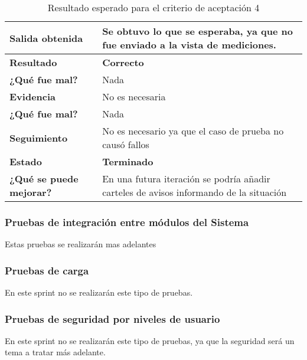 {\scriptsize
	\begin{table}[h]

	\centering
	\begin{tabular}{|m{3cm}|m{10cm}|}
	    \hline 
	    \textbf{Salida obtenida}&Se obtuvo lo que se esperaba, ya que no fue enviado a la vista de mediciones.\\ \hline
	    \textbf{Resultado}& \textbf{Correcto}\\ \hline
        \textbf{¿Qué fue mal?}& Nada\\ \hline        
        \textbf{Evidencia}&No es necesaria  \\ \hline
        \textbf{¿Qué fue mal?}& Nada\\ \hline      
        \textbf{Seguimiento}& No es necesario ya que el caso de prueba no causó fallos \\ \hline
        \textbf{Estado}& \textbf{Terminado}\\ \hline        
        \textbf{¿Qué se puede mejorar?}& En una futura iteración se podría añadir carteles de avisos informando de la situación\\ \hline              
	    \end{tabular}
        \caption{Resultado esperado para el criterio de aceptación 4}
   	\end{table}
	}


\clearpage
\subsubsection{Pruebas de integración entre módulos del Sistema}
Estas pruebas se realizarán mas adelantes
\subsubsection{Pruebas de carga}
En este sprint no se realizarán este tipo de pruebas.
\subsubsection{Pruebas de seguridad por niveles de usuario}
En este sprint no se realizarán este tipo de pruebas, ya que la seguridad será un tema a tratar más adelante.

